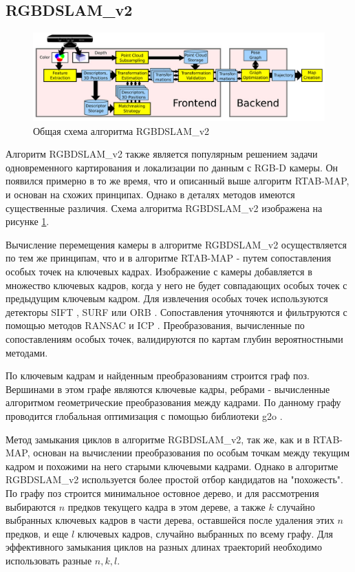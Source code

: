 \documentclass{mipt-thesis-ms}
\begin{document}
	\subsection{RGBDSLAM\_v2}
	
	\begin{figure}
		\includegraphics[width=1.0\textwidth]{img/rgbdslam_scheme.png}
		\caption{Общая схема алгоритма RGBDSLAM\_v2}
		\label{figure_rgbdslam}
	\end{figure}
	
	Алгоритм RGBDSLAM\_v2 \cite{endres20133} также является популярным решением задачи одновременного картирования и локализации по данным с RGB-D камеры. Он появился примерно в то же время, что и описанный выше алгоритм RTAB-MAP, и основан на схожих принципах. Однако в деталях методов имеются существенные различия. Схема алгоритма RGBDSLAM\_v2 изображена на рисунке \ref{figure_rgbdslam}.
	
	Вычисление перемещения камеры в алгоритме RGBDSLAM\_v2 осуществляется по тем же принципам, что и в алгоритме RTAB-MAP - путем сопоставления особых точек на ключевых кадрах. Изображение с камеры добавляется в множество ключевых кадров, когда у него не будет совпадающих особых точек с предыдущим ключевым кадром. Для извлечения особых точек используются детекторы SIFT \cite{lowe2004distinctive}, SURF \cite{bay2006surf} или ORB \cite{rublee2011orb}. Сопоставления уточняются и фильтруются с помощью методов RANSAC \cite{brachmann2017dsac} и ICP \cite{chetverikov2005robust}. Преобразования, вычисленные по сопоставлениям особых точек, валидируются по картам глубин вероятностными методами.
	
	По ключевым кадрам и найденным преобразованиям строится граф поз. Вершинами в этом графе являются ключевые кадры, ребрами - вычисленные алгоритмом геометрические преобразования между кадрами. По данному графу проводится глобальная оптимизация с помощью библиотеки g2o \cite{grisetti2011g2o}.
	
	Метод замыкания циклов в алгоритме RGBDSLAM\_v2, так же, как и в RTAB-MAP, основан на вычислении преобразования по особым точкам между текущим кадром и похожими на него старыми ключевыми кадрами. Однако в алгоритме RGBDSLAM\_v2 используется более простой отбор кандидатов на "похожесть". По графу поз строится минимальное остовное дерево, и для рассмотрения выбираются $n$ предков текущего кадра в этом дереве, а также $k$ случайно выбранных ключевых кадров в части дерева, оставшейся после удаления этих $n$ предков, и еще $l$ ключевых кадров, случайно выбранных по всему графу. Для эффективного замыкания циклов на разных длинах траекторий необходимо использовать разные $n, k, l$.
	
\end{document}
